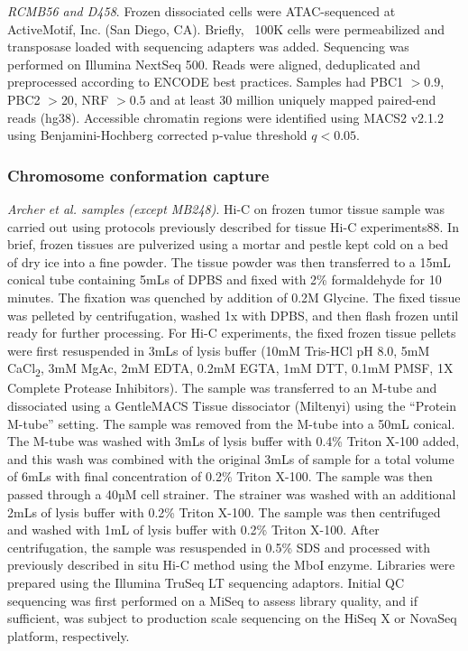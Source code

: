 \textit{RCMB56 and D458}. Frozen dissociated cells were ATAC-sequenced at ActiveMotif, Inc. (San Diego, CA). Briefly, ~100K cells were permeabilized and transposase loaded with sequencing adapters was added. Sequencing was performed on Illumina NextSeq 500. Reads were aligned, deduplicated and preprocessed according to ENCODE best practices. Samples had PBC1 $> 0.9$, PBC2 $> 20$, NRF $> 0.5$ and at least 30 million uniquely mapped paired-end reads (hg38). Accessible chromatin regions were identified using MACS2 v2.1.2 \cite{macs} using Benjamini-Hochberg corrected p-value threshold $q < 0.05$.
\subsubsection{Chromosome conformation capture}
\textit{Archer et al. samples (except MB248)}. Hi-C on frozen tumor tissue sample was carried out using protocols previously described for tissue Hi-C experiments88. In brief, frozen tissues are pulverized using a mortar and pestle kept cold on a bed of dry ice into a fine powder. The tissue powder was then transferred to a 15mL conical tube containing 5mLs of DPBS and fixed with 2\% formaldehyde for 10 minutes. The fixation was quenched by addition of 0.2M Glycine. The fixed tissue was pelleted by centrifugation, washed 1x with DPBS, and then flash frozen until ready for further processing. For Hi-C experiments, the fixed frozen tissue pellets were first resuspended in 3mLs of lysis buffer (10mM Tris-HCl pH 8.0, 5mM CaCl\textsubscript{2}, 3mM MgAc, 2mM EDTA, 0.2mM EGTA, 1mM DTT, 0.1mM PMSF, 1X Complete Protease Inhibitors). The sample was transferred to an M-tube and dissociated using a GentleMACS Tissue dissociator (Miltenyi) using the ``Protein M-tube'' setting. The sample was removed from the M-tube into a 50mL conical. The M-tube was washed with 3mLs of lysis buffer with 0.4\% Triton X-100 added, and this wash was combined with the original 3mLs of sample for a total volume of 6mLs with final concentration of 0.2\% Triton X-100. The sample was then passed through a 40µM cell strainer. The strainer was washed with an additional 2mLs of lysis buffer with 0.2\% Triton X-100. The sample was then centrifuged and washed with 1mL of lysis buffer with 0.2\% Triton X-100. After centrifugation, the sample was resuspended in 0.5\% SDS and processed with previously described in situ Hi-C method \cite{rao_2014} using the MboI enzyme. Libraries were prepared using the Illumina TruSeq LT sequencing adaptors. Initial QC sequencing was first performed on a MiSeq to assess library quality, and if sufficient, was subject to production scale sequencing on the HiSeq X or NovaSeq platform, respectively.

